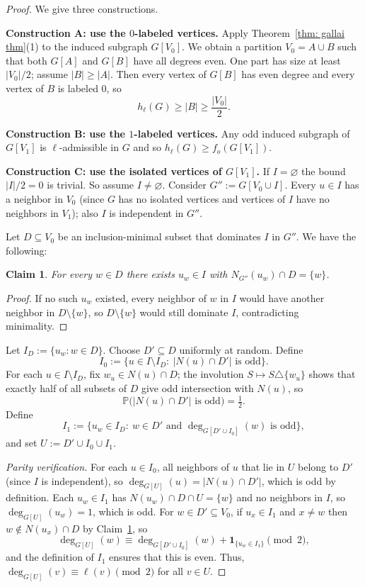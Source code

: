 \documentclass{article}
\newcommand{\2}{\vspace{0.2cm}}
\newtheorem{claim}[theorem]{Claim}
\begin{document}
\begin{proof}
We give three constructions.

\medskip
\noindent\textbf{Construction A: use the $0$-labeled vertices.}
Apply Theorem~\ref{thm: gallai thm}(1) to the induced subgraph $G[V_0]$. We obtain a partition $V_0=A\cup B$ such that both $G[A]$ and $G[B]$ have all degrees even. One part has size at least $|V_0|/2$; assume $|B|\ge|A|$. Then every vertex of $G[B]$ has even degree and every vertex of $B$ is labeled 0, so
$$
h_{\ell}(G)\ge|B|\ge\frac{|V_0|}{2}.
$$

\medskip
\noindent\textbf{Construction B: use the $1$-labeled vertices.}
Any odd induced subgraph of $G[V_1]$ is $\ell$-admissible in $G$ and so $h_{\ell}(G)\ge f_o(G[V_1])$.

\medskip
\noindent\textbf{Construction C: use the isolated vertices of $G[V_1]$.}
If $I=\varnothing$ the bound $|I|/2=0$ is trivial. So assume $I\neq\varnothing$. Consider $G'':=G[V_0\cup I]$. Every $u\in I$ has a neighbor in $V_0$ (since $G$ has no isolated vertices and vertices of $I$ have no neighbors in $V_1$); also $I$ is independent in $G''$.

Let $D\subseteq V_0$ be an inclusion-minimal subset that dominates $I$ in $G''$. We have the following: %

\begin{claim}\label{clm:private}
For every $w\in D$ there exists $u_w\in I$ with $N_{G''}(u_w)\cap D=\{w\}$.
\end{claim}
\begin{proof}
If no such $u_w$ existed, every neighbor of $w$ in $I$ would have another neighbor in $D\setminus\{w\}$, so $D\setminus\{w\}$ would still dominate $I$, contradicting minimality.
\end{proof}

Let $I_D:=\{u_w:w\in D\}$. Choose $D'\subseteq D$ uniformly at random. Define
$$
I_0:=\{u\in I\setminus I_D:\ |N(u)\cap D'|\text{ is odd}\}.
$$
For each $u\in I\setminus I_D$, fix $w_u\in N(u)\cap D$; the involution $S\mapsto S\triangle\{w_u\}$ shows that exactly half of all subsets of $D$ give odd intersection with $N(u)$, so
$$
\mathbb{P}\bigl(|N(u)\cap D'|\text{ is odd}\bigr)=\tfrac{1}{2}.
$$
Define
$$
I_1:=\{u_w\in I_D:\ w\in D'\text{ and }\deg_{G[D'\cup I_0]}(w)\text{ is odd}\},
$$
and set $U:=D'\cup I_0\cup I_1$.

\emph{Parity verification.} For each $u\in I_0$, all neighbors of $u$ that lie in $U$ belong to $D'$ (since $I$ is independent), 
so $\deg_{G[U]}(u)=|N(u)\cap D'|$, which is odd by definition. Each $u_w\in I_1$ has $N(u_w)\cap D\cap U=\{w\}$ and 
no neighbors in $I$, so $\deg_{G[U]}(u_w)=1$, which is odd. For $w\in D'\subseteq V_0$, if $u_x\in I_1$ 
and $x\neq w$ then $w\notin N(u_x)\cap D$ by Claim~\ref{clm:private}, so
$$
\deg_{G[U]}(w)\equiv \deg_{G[D'\cup I_0]}(w)+\mathbf{1}_{\{u_w\in I_1\}}\pmod{2},
$$
and the definition of $I_1$ ensures that this is even. Thus, $\deg_{G[U]}(v)\equiv \ell(v)\pmod{2}$ for all $v\in U$.


\end{proof}
\end{document}
